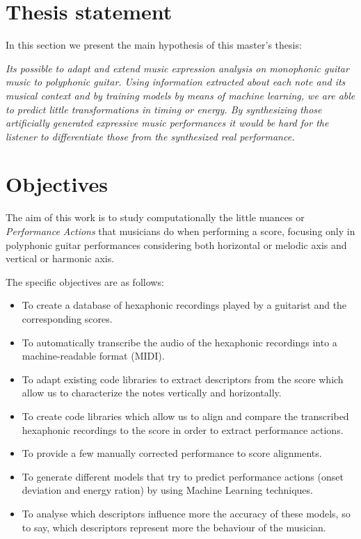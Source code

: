 \section{Thesis statement}
In this section we present the main hypothesis of this master's thesis:

\textit{Its possible to adapt and extend music expression analysis on monophonic guitar music to polyphonic guitar. Using information extracted about each note and its musical context and by training models by means of machine learning, we are able to predict little transformations in timing or energy. By synthesizing those artificially generated expressive music performances it would be hard for the listener to differentiate those from the synthesized real performance.}

\section{Objectives}
The aim of this work is to study computationally the little nuances or \textit{Performance Actions} that musicians do when performing a score, focusing only in polyphonic guitar performances considering both horizontal or melodic axis and vertical or harmonic axis.

The specific objectives are as follows:

\begin{itemize}[noitemsep]
\item To create a database of hexaphonic recordings played by a guitarist and the corresponding scores.
\item To automatically transcribe the audio of the hexaphonic recordings into a machine-readable format (MIDI).
\item To adapt existing code libraries to extract descriptors from the score which allow us to characterize the notes vertically and horizontally.
\item To create code libraries which allow us to align and compare the transcribed hexaphonic recordings to the score in order to extract performance actions.
\item To provide a few manually corrected performance to score alignments.
\item To generate different models that try to predict performance actions (onset deviation and energy ration) by using Machine Learning techniques.
\item To analyse which descriptors influence more the accuracy of these models, so to say, which descriptors represent more the behaviour of the musician.
\end{itemize}

